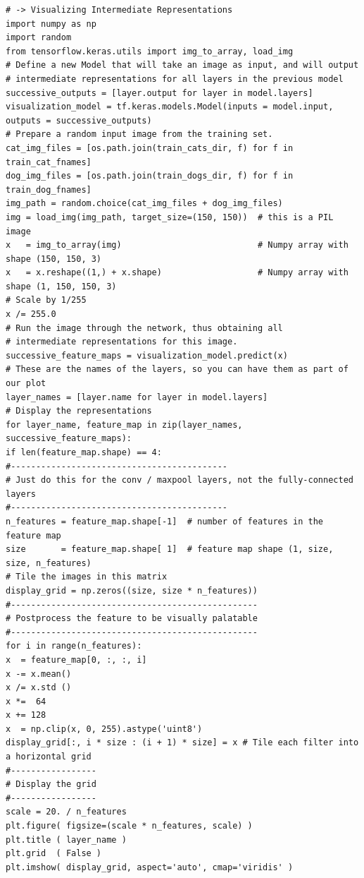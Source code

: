 \documentclass[20pt]{article}
\begin{document}
\begin{itemize}
\begin{verbatim}
# -> Visualizing Intermediate Representations
import numpy as np
import random
from tensorflow.keras.utils import img_to_array, load_img
# Define a new Model that will take an image as input, and will output
# intermediate representations for all layers in the previous model
successive_outputs = [layer.output for layer in model.layers]
visualization_model = tf.keras.models.Model(inputs = model.input, outputs = successive_outputs)
# Prepare a random input image from the training set.
cat_img_files = [os.path.join(train_cats_dir, f) for f in train_cat_fnames]
dog_img_files = [os.path.join(train_dogs_dir, f) for f in train_dog_fnames]
img_path = random.choice(cat_img_files + dog_img_files)
img = load_img(img_path, target_size=(150, 150))  # this is a PIL image
x   = img_to_array(img)                           # Numpy array with shape (150, 150, 3)
x   = x.reshape((1,) + x.shape)                   # Numpy array with shape (1, 150, 150, 3)
# Scale by 1/255
x /= 255.0
# Run the image through the network, thus obtaining all
# intermediate representations for this image.
successive_feature_maps = visualization_model.predict(x)
# These are the names of the layers, so you can have them as part of our plot
layer_names = [layer.name for layer in model.layers]
# Display the representations
for layer_name, feature_map in zip(layer_names, successive_feature_maps):
if len(feature_map.shape) == 4:
#-------------------------------------------
# Just do this for the conv / maxpool layers, not the fully-connected layers
#-------------------------------------------
n_features = feature_map.shape[-1]  # number of features in the feature map
size       = feature_map.shape[ 1]  # feature map shape (1, size, size, n_features)
# Tile the images in this matrix
display_grid = np.zeros((size, size * n_features))
#-------------------------------------------------
# Postprocess the feature to be visually palatable
#-------------------------------------------------
for i in range(n_features):
x  = feature_map[0, :, :, i]
x -= x.mean()
x /= x.std ()
x *=  64
x += 128
x  = np.clip(x, 0, 255).astype('uint8')
display_grid[:, i * size : (i + 1) * size] = x # Tile each filter into a horizontal grid
#-----------------
# Display the grid
#-----------------
scale = 20. / n_features
plt.figure( figsize=(scale * n_features, scale) )
plt.title ( layer_name )
plt.grid  ( False )
plt.imshow( display_grid, aspect='auto', cmap='viridis' ) 


\end{verbatim}
\end{itemize}
\end{document}
